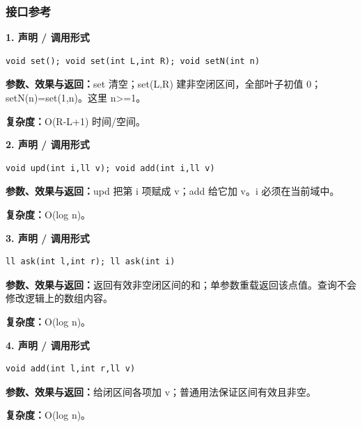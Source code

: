 \documentclass[UTF8,a4paper,10pt]{ctexart}
\begin{document}
\subsubsection*{接口参考}
\noindent\begin{minipage}{\textwidth}
\textbf{1. 声明 / 调用形式}
\begin{lstlisting}
void set(); void set(int L,int R); void setN(int n)
\end{lstlisting}
\textbf{参数、效果与返回：}set 清空；set(L,R) 建非空闭区间，全部叶子初值 0；setN(n)=set(1,n)。这里 n>=1。

\textbf{复杂度：}O(R-L+1) 时间/空间。

\end{minipage}\par\vspace{0.4em}
\noindent\begin{minipage}{\textwidth}
\textbf{2. 声明 / 调用形式}
\begin{lstlisting}
void upd(int i,ll v); void add(int i,ll v)
\end{lstlisting}
\textbf{参数、效果与返回：}upd 把第 i 项赋成 v；add 给它加 v。i 必须在当前域中。

\textbf{复杂度：}O(log n)。

\end{minipage}\par\vspace{0.4em}
\noindent\begin{minipage}{\textwidth}
\textbf{3. 声明 / 调用形式}
\begin{lstlisting}
ll ask(int l,int r); ll ask(int i)
\end{lstlisting}
\textbf{参数、效果与返回：}返回有效非空闭区间的和；单参数重载返回该点值。查询不会修改逻辑上的数组内容。

\textbf{复杂度：}O(log n)。

\end{minipage}\par\vspace{0.4em}
\noindent\begin{minipage}{\textwidth}
\textbf{4. 声明 / 调用形式}
\begin{lstlisting}
void add(int l,int r,ll v)
\end{lstlisting}
\textbf{参数、效果与返回：}给闭区间各项加 v；普通用法保证区间有效且非空。

\textbf{复杂度：}O(log n)。

\end{minipage}\par\vspace{0.4em}
\end{document}
